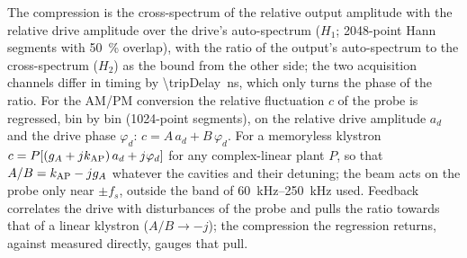 The compression is the cross-spectrum of the relative output amplitude with the relative drive amplitude over the drive's auto-spectrum ($H_1$; 2048-point Hann segments with \SI{50}{\percent} overlap), with the ratio of the output's auto-spectrum to the cross-spectrum ($H_2$) as the bound from the other side; the two acquisition channels differ in timing by \SI{\tripDelay}{ns}, which only turns the phase of the ratio. For the AM/PM conversion the relative fluctuation $c$ of the probe is regressed, bin by bin (1024-point segments), on the relative drive amplitude $a_d$ and the drive phase $\varphi_d$: $c=A\,a_d+B\,\varphi_d$. For a memoryless klystron $c=P[(g_A+jk_\mathrm{AP})\,a_d+j\varphi_d]$ for any complex-linear plant $P$, so that $A/B=k_\mathrm{AP}-jg_A$ whatever the cavities and their detuning; the beam acts on the probe only near $\pm f_s$, outside the band of \SIrange{60}{250}{kHz} used. Feedback correlates the drive with disturbances of the probe and pulls the ratio towards that of a linear klystron ($A/B\to-j$); the compression the regression returns, \tripGARatio{} against \tripGA{} measured directly, gauges that pull.
